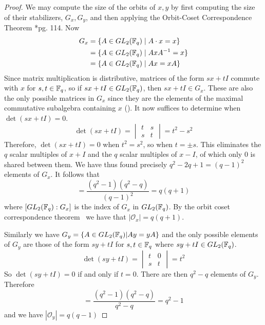 \documentclass{amsart}
\begin{document}
\begin{proof}
    We may compute the size of the orbits of $x, y$ by first computing the size of their stabilizers, $G_x, G_y$, and then applying the Orbit-Coset Correspondence Theorem \cite{DandF}*{pg. 114}.
    Now
    \begin{align*}
        G_x &= \{A \in GL_2(\protect\mathbb{F}_q) \mid A \cdot x = x\} \\
            &= \{A \in GL_2(\protect\mathbb{F}_q) \mid AxA^{-1} = x\} \\
            &= \{A \in GL_2(\protect\mathbb{F}_q) \mid Ax = xA\} 
    \end{align*}
    Since matrix multiplication is distributive, matrices of the form $sx + tI$ commute with $x$ for $s,t \in \protect\mathbb{F}_q$, so if $sx + tI \in GL_2(\protect\mathbb{F}_q)$, then $sx + tI \in G_x$. These are also the only possible matrices in $G_x$ since they are the elements of the maximal commutative subalgebra containing $x$ (). It now suffices to determine when $\det(sx + tI) = 0$.
    \begin{equation*}
        \det(sx+tI) =
        \begin{vmatrix}
            t & s \\
            s & t
        \end{vmatrix} = t^2 - s^2
    \end{equation*}
    Therefore, $\det(sx + tI) = 0$ when $t^2 = s^2$, so when $t = \pm s$. This eliminates the $q$ scalar multiples of $x + I$ and the $q$ scalar multiples of $x - I$, of which only $0$ is shared between them. We have thus found precisely $q^2 - 2q + 1 = (q-1)^2$ elements of $G_x$. It follows that
    \begin{equation*}
        [GL_2(\bF_q) : G_x] = \frac{(q^2-1)(q^2-q)}{(q-1)^2} = q(q + 1)
    \end{equation*}
    where $[GL_2(\protect\mathbb{F}_q) : G_x]$ is the index of $G_x$ in $GL_2(\protect\mathbb{F}_q)$. By the orbit coset correspondence theorem~\cite{DandF} we have that $|\mathcal{O}_x| = q(q + 1)$.

    Similarly we have $G_y = \{A \in GL_2(\protect\mathbb{F}_q) | Ay = yA\}$ and the only possible elements of $G_y$ are those of the form $sy + tI$ for $s,t \in \protect\mathbb{F}_q$ where $sy+tI \in GL_2(\protect\mathbb{F}_q)$.
    \begin{equation*}
        \det(sy+tI) =
        \begin{vmatrix}
            t & 0 \\
            s & t
        \end{vmatrix} = t^2
    \end{equation*}
    So $\det(sy + tI) = 0$ if and only if $t = 0$. There are then $q^2 - q$ elements of $G_y$. Therefore
    \begin{equation*}
        [GL_2(\bF_q) : G_y] = \frac{(q^2-1)(q^2-q)}{q^2 - q} = q^2 - 1
    \end{equation*}
    and we have $|\mathcal{O}_y| = q(q - 1)$
\end{proof}
\end{document}
